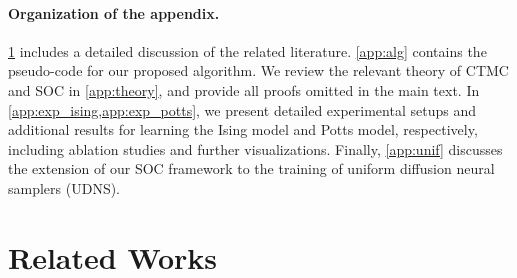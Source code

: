 \documentclass{article}
\theoremstyle{remark}
\begin{document}
\paragraph{Organization of the appendix.} \cref{app:rel_work} includes a detailed discussion of the related literature. \cref{app:alg} contains the pseudo-code for our proposed algorithm. We review the relevant theory of CTMC and SOC in \cref{app:theory}, and provide all proofs omitted in the main text. In \cref{app:exp_ising,app:exp_potts}, we present detailed experimental setups and additional results for learning the Ising model and Potts model, respectively,  including ablation studies and further visualizations. Finally, \cref{app:unif} discusses the extension of our SOC framework to the training of uniform diffusion neural samplers (UDNS).


\section{Related Works}
\label{app:rel_work}
\end{document}
